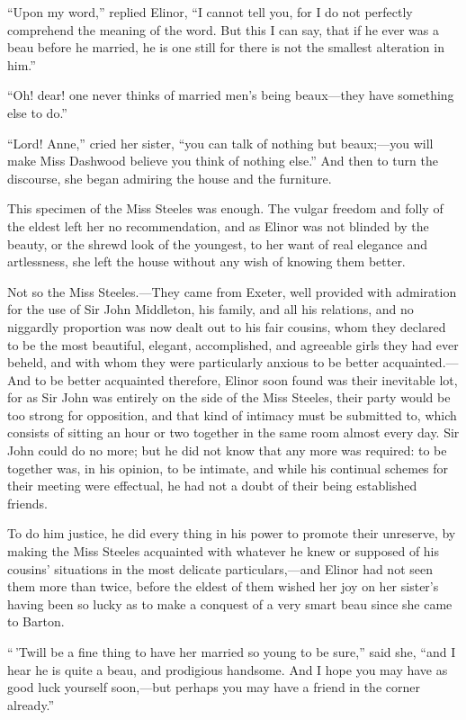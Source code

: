 ``Upon my word,'' replied Elinor, ``I cannot tell you,
for I do not perfectly comprehend the meaning of the word.
But this I can say, that if he ever was a beau before
he married, he is one still for there is not the smallest
alteration in him.''

``Oh! dear! one never thinks of married men's being
beaux---they have something else to do.''

``Lord! Anne,'' cried her sister, ``you can talk of
nothing but beaux;---you will make Miss Dashwood believe you
think of nothing else.'' And then to turn the discourse,
she began admiring the house and the furniture.

This specimen of the Miss Steeles was enough.
The vulgar freedom and folly of the eldest left
her no recommendation, and as Elinor was not blinded
by the beauty, or the shrewd look of the youngest,
to her want of real elegance and artlessness, she left
the house without any wish of knowing them better.

Not so the Miss Steeles.---They came from Exeter, well
provided with admiration for the use of Sir John Middleton,
his family, and all his relations, and no niggardly
proportion was now dealt out to his fair cousins, whom they
declared to be the most beautiful, elegant, accomplished,
and agreeable girls they had ever beheld, and with whom
they were particularly anxious to be better acquainted.---%
And to be better acquainted therefore, Elinor soon found
was their inevitable lot, for as Sir John was entirely
on the side of the Miss Steeles, their party would be
too strong for opposition, and that kind of intimacy
must be submitted to, which consists of sitting an hour
or two together in the same room almost every day.
Sir John could do no more; but he did not know that any
more was required: to be together was, in his opinion,
to be intimate, and while his continual schemes for their
meeting were effectual, he had not a doubt of their being
established friends.

To do him justice, he did every thing in his power
to promote their unreserve, by making the Miss Steeles
acquainted with whatever he knew or supposed of his cousins'
situations in the most delicate particulars,---and Elinor
had not seen them more than twice, before the eldest of
them wished her joy on her sister's having been so lucky
as to make a conquest of a very smart beau since she
came to Barton.

``\,'Twill be a fine thing to have her married so young
to be sure,'' said she, ``and I hear he is quite a beau,
and prodigious handsome.  And I hope you may have as good
luck yourself soon,---but perhaps you may have a friend
in the corner already.''

